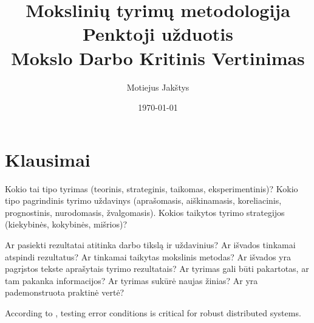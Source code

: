 \documentclass{article}
\title{
    Mokslinių tyrimų metodologija\\
    Penktoji užduotis\\ \vspace{4mm}
    Mokslo Darbo Kritinis Vertinimas
}
\author{Motiejus Jakštys}
\date{\today}
\begin{document}
\maketitle


\section{Klausimai}
    Kokio tai tipo tyrimas (teorinis, strateginis,  taikomas, eksperimentinis)?
    Kokio tipo pagrindinis tyrimo uždavinys (aprašomasis, aiškinamasis, koreliacinis, prognostinis, nurodomasis, žvalgomasis).
    Kokios taikytos tyrimo strategijos (kiekybinės, kokybinės, mišrios)?

    Ar pasiekti rezultatai atitinka darbo tikslą ir uždavinius?
    Ar išvados tinkamai atspindi rezultatus?
    Ar tinkamai taikytas mokslinis metodas?
    Ar išvados yra pagrįstos tekste aprašytais tyrimo rezultatais?
    Ar tyrimas gali būti pakartotas, ar tam pakanka informacijos?
    Ar tyrimas sukūrė naujas žinias? Ar yra pademonstruota  praktinė vertė?


According to \cite{186171}, testing error conditions is critical for robust
distributed systems.

\printbibliography
\end{document}
